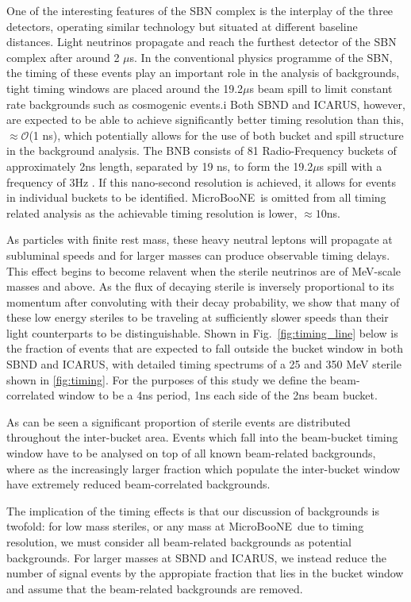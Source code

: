 \documentclass[11pt, a4paper]{article}
\newcommand{\reffig}[1]{Fig.~\ref{#1}}
\def\muboone{MicroBooNE}
\begin{document}
One of the interesting features of the SBN complex is the interplay of the
three detectors, operating similar technology but situated at different
baseline distances. Light neutrinos propagate and reach the furthest detector
of the SBN complex after around 2 $\mu$s. In the conventional physics programme
of the SBN, the timing of these events play an important role in the analysis
of backgrounds, tight timing windows are placed around the 19.2$\mu$s beam
spill to limit constant rate backgrounds such as cosmogenic events.i Both SBND
and ICARUS, however, are expected to be able to achieve significantly better
timing resolution than this, $\approx \mathcal{O}$(1 ns), which potentially allows for the use of both bucket
and spill structure in the background analysis. The BNB consists of 81
Radio-Frequency buckets of approximately 2ns length, separated by 19 ns, to
form the 19.2$\mu$s spill with a frequency of 3Hz \cite{Antonello:2015lea}.
If this nano-second resolution is achieved, it allows for events in individual buckets to be
identified. \muboone\ is omitted from all timing related analysis as the achievable timing
resolution is lower, $\approx 10$ns.

As particles with finite rest mass, these heavy neutral leptons will propagate
at subluminal speeds and for larger masses can produce observable timing
delays. This effect begins to become relavent when the sterile neutrinos are of
MeV-scale masses and above. As the flux of decaying sterile is inversely
proportional to its momentum after convoluting with their decay probability, we show that many of these low energy steriles to be
traveling at sufficiently slower speeds than their light counterparts to be distinguishable. Shown
in \reffig{fig:timing_line} below is the fraction of events that are expected
to fall outside the  bucket window in both SBND and ICARUS, with detailed
timing spectrums of a 25 and 350 MeV sterile shown in \ref{fig:timing}. For the purposes of this study we define the beam-correlated window to be a 4ns period, 1ns each side of the 2ns beam bucket.

As can be seen a significant proportion of sterile events are distributed throughout the inter-bucket area. Events which fall into the beam-bucket timing window have to be analysed on top of all known beam-related backgrounds, where as the increasingly larger fraction which populate the inter-bucket window have extremely reduced beam-correlated backgrounds.  

The implication of the timing effects is that our discussion of backgrounds is
twofold: for low mass steriles, or any mass at \muboone\ due to timing
resolution, we must consider all beam-related backgrounds as potential
backgrounds. For larger masses at SBND and ICARUS, we instead reduce the number of signal events by the appropiate fraction that lies in the bucket window and assume that the beam-related backgrounds are removed. 
\end{document}
